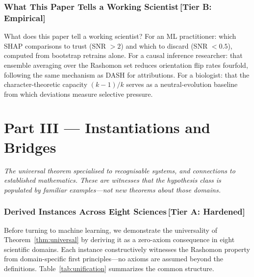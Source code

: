 \documentclass[11pt,a4paper]{article}
\begin{document}
\section{What This Paper Tells a Working Scientist\,\textnormal{\normalsize[Tier B: Empirical]}}
\label{sec:working-scientist}

What does this paper tell a working scientist?  For an ML practitioner: which SHAP comparisons to trust (SNR $> 2$) and which to discard (SNR $< 0.5$), computed from bootstrap retrains alone.  For a causal inference researcher: that ensemble averaging over the Rashomon set reduces orientation flip rates fourfold, following the same mechanism as DASH for attributions.  For a biologist: that the character-theoretic capacity $(k{-}1)/k$ serves as a neutral-evolution baseline from which deviations measure selective pressure.


\clearpage
\part{Part III \textnormal{\large --- Instantiations and Bridges}}
\noindent\emph{The universal theorem specialised to recognisable systems, and connections to established mathematics. These are witnesses that the hypothesis class is populated by familiar examples---not new theorems about those domains.}\par\medskip

\section{Derived Instances Across Eight Sciences\,\textnormal{\normalsize[Tier A: Hardened]}}
\label{sec:derived-instances}

Before turning to machine learning, we demonstrate the universality of
Theorem~\ref{thm:universal} by deriving it as a zero-axiom consequence in
eight scientific domains.  Each instance constructively witnesses the Rashomon
property from domain-specific first principles---no axioms are assumed beyond
the definitions.  Table~\ref{tab:unification} summarizes the common structure.
\end{document}
